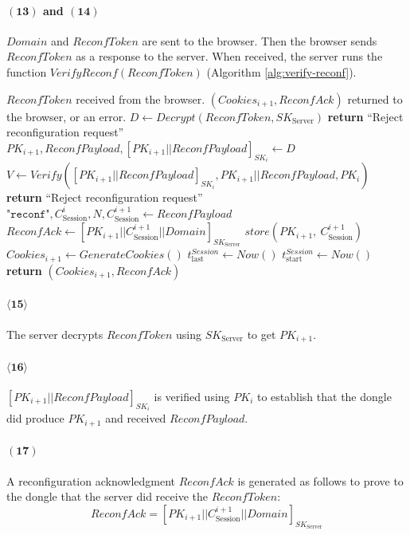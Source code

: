 \paragraph{$\boldsymbol{(13)}$ and $\boldsymbol{(14)}$} $Domain$ and $ReconfToken$ are sent to the browser. Then the browser sends $ReconfToken$ as a response to the server. When received, the server runs the function $VerifyReconf(ReconfToken)$ (Algorithm \ref{alg:verify-reconf}).

\begin{algorithm}[ht!]
\caption{$VerifyReconf(ReconfToken)$}
\begin{algorithmic}[1]
    \Require $ReconfToken$ received from the browser.
    \Ensure  $(Cookies_{i+1}, ReconfAck)$ returned to the browser, or an error.
    \State $D \leftarrow Decrypt(ReconfToken, SK_{\text{Server}})$
        \State \textbf{return} ``Reject reconfiguration request''
    \EndIf
    \State $PK_{i+1},ReconfPayload,[PK_{i+1}||ReconfPayload]_{SK_i} \leftarrow D$
    \State $V \leftarrow Verify([PK_{i+1}||ReconfPayload]_{SK_i}, PK_{i+1}||ReconfPayload, PK_i)$
        \State \textbf{return} ``Reject reconfiguration request''
    \EndIf
    \State $\texttt{"reconf"}, C^i_{\text{Session}}, N, C^{i+1}_{\text{Session}} \leftarrow ReconfPayload$
    \State $ReconfAck \leftarrow [PK_{i+1}|| C^{i+1}_{\text{Session}}|| Domain]_{SK_{\text{Server}}}$
    \State $store(PK_{i+1},\ C^{i+1}_{\text{Session}})$
    \State $Cookies_{i+1} \leftarrow GenerateCookies()$
    \State $t^{Session}_{\text{last}} \leftarrow Now()$ 
    \State $t^{Session}_{\text{start}} \leftarrow Now()$
    \State \textbf{return} $(Cookies_{i+1}, ReconfAck)$
\end{algorithmic}
\label{alg:verify-reconf}
\end{algorithm}
\paragraph{$\boldsymbol{\langle15\rangle}$} The server decrypts $ReconfToken$ using $SK_\text{Server}$ to get $PK_{i+1}$.
\paragraph{$\boldsymbol{\langle16\rangle}$} $[PK_{i+1}||ReconfPayload]_{SK_i}$ is verified using $PK_i$ to establish that the dongle did produce ${PK_{i+1}}$ and received $ReconfPayload$.
\paragraph{$\boldsymbol{(17)}$} A reconfiguration acknowledgment $ReconfAck$ is generated as follows to prove to the dongle that the server did receive the $ReconfToken$:
$$ReconfAck=[PK_{i+1}|| C^{i+1}_{\text{Session}}|| Domain]_{SK_{\text{Server}}}$$
